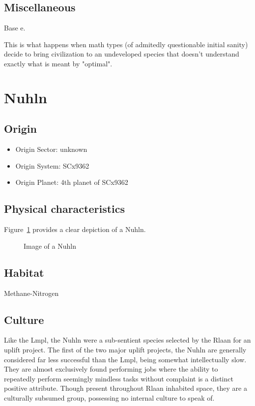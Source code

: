 \subsection{Miscellaneous}
Base e.

This is what happens when math types (of admitedly questionable
initial sanity) decide to bring civilization to an undeveloped species
that doesn't understand exactly what is meant by "optimal".

\section{Nuhln}

\subsection{Origin}
\begin{itemize}
\item Origin Sector: unknown
\item Origin System: SCx9362
\item Origin Planet: 4th planet of SCx9362
\end{itemize}

\subsection{Physical characteristics}
Figure~\ref{fig:Nuhln} provides a clear depiction of a Nuhln.

\begin{figure}
\begin{center}
    \caption{Image of a Nuhln}
    \label{fig:Nuhln}
\end{center}
\end{figure}

 
\subsection{Habitat}
Methane-Nitrogen 

\subsection{Culture}
Like the Lmpl, the Nuhln were a sub-sentient species selected by the
Rlaan for an uplift project. The first of the two major uplift
projects, the Nuhln are generally considered far less successful than
the Lmpl, being somewhat intellectually slow. They are almost
exclusively found performing jobs where the ability to repeatedly
perform seemingly mindless tasks without complaint is a distinct
positive attribute. Though present throughout Rlaan inhabited space,
they are a culturally subsumed group, possessing no internal culture
to speak of.

